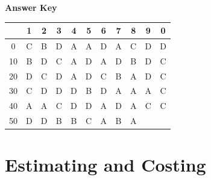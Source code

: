 \documentclass[11pt,a4paper]{article}
\begin{document}
\textbf{Answer Key}
\begin{tabular}{ | c | c c c c c c c c c c | }
\hline
 & 1 & 2 & 3 & 4 & 5 & 6 & 7 & 8 & 9 & 0 \\
\hline
0 & C & B & D & A & A & D & A & C & D & D \\
10 & B & D & C & A & D & A & D & B & D & C \\
20 & D & C & D & A & D & C & B & A & D & C \\
30 & C & D & D & D & B & D & A & A & A & C \\
40 & A & A & C & D & D & A & D & A & C & C \\
50 & D & D & B & B & C & A & B & A &   &   \\
\hline
\end{tabular}
\clearpage
\section{Estimating and Costing}
\end{document}
